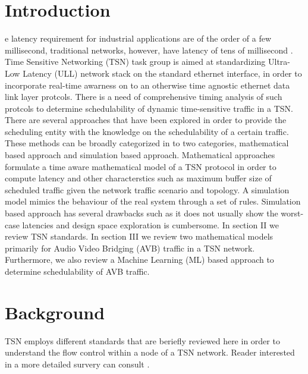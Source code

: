 \documentclass[journal,12pt,twocolumn]{IEEEtran}
\begin{document}
\section{Introduction}
% 
% 
% 
% 
e latency requirement for industrial applications are of the order of a few millisecond, traditional networks, however, have latency of tens of millisecond \cite{LATENCY}.  Time Sensitive Networking (TSN) task group \cite{TSN} is aimed at standardizing Ultra-Low Latency (ULL) network stack on the standard ethernet interface, in order to incorporate real-time awarness on to an otherwise time agnostic ethernet data link layer protcols. There is a need of comprehensive timing analysis of such protcols to determine schedulability of dynamic time-sensitive traffic in a TSN.  There are several approaches that have been explored in order to provide the scheduling entity with the knowledge on the schedulability of a certain traffic. These methods can be broadly categorized in to two categories, mathematical based approach and simulation based approach. Mathematical approaches formulate a time aware mathematical model of a TSN protocol in order to compute latency and other characterstics such as maximum buffer size of scheduled traffic given the network traffic scenario and topology. A simulation model mimics the behaviour of the real system through a set of rules. Simulation based approach has several drawbacks such as it does not usually show the worst-case latencies and design space exploration is cumbersome. In section II we review TSN standards.  In section III we review two mathematical models primarily for Audio Video Bridging (AVB) traffic in a TSN network. Furthermore, we also review a Machine Learning (ML) based approach to determine schedulability of AVB traffic.

\section {Background}
TSN employs different standards that are beriefly reviewed here in order to understand the flow control within a node of a TSN network. Reader interested in a more detailed survery can consult \cite {ULL}.
\end{document}
